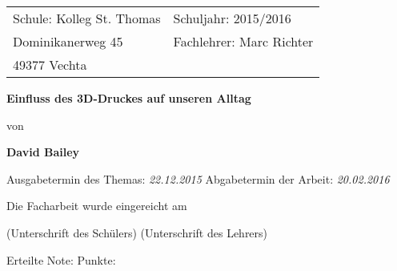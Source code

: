 \begin{titlepage}

\begin{tabular}{@{}p{3.8in}l}
Schule: Kolleg St. Thomas       & Schuljahr: 2015/2016\\
Dominikanerweg 45   & Fachlehrer: Marc Richter\\
49377 Vechta           & \\
\end{tabular}

\vspace{7.5cm}

\centering
{\Large\bf Einfluss des 3D-Druckes auf unseren Alltag \par\vspace{1cm}}
von \par\vspace{1cm}
{\bf David Bailey}

\vfill

Ausgabetermin des Themas: \emph{22.12.2015}
\hfill Abgabetermin der Arbeit: \emph{20.02.2016}

\vspace{0.8cm}

Die Facharbeit wurde eingereicht am  \underline{\hspace{8.7cm}}

\vspace{0.8cm}

\raggedright
\underline{\hspace{6.8cm}} \hfill
\underline{\hspace{6.8cm}}

\raggedright
(Unterschrift des Schülers)
\hspace{3.5cm} (Unterschrift des Lehrers)

\vspace{0.8cm}

\raggedright
Erteilte Note:\underline{\hspace{4.5cm}}
\hfill Punkte:\underline{\hspace{5.5cm}}

\end{titlepage}

\setcounter{page}{2}